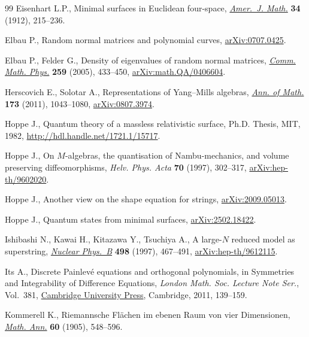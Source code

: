 \begin{thebibliography}{99}
Eisenhart L.P., Minimal surfaces in {E}uclidean four-space,
 \href{https://doi.org/10.2307/2370220}{\textit{Amer.~J. Math.}} \textbf{34}
 (1912), 215--236.

Elbau P., Random normal matrices and polynomial curves,
 \href{http://arxiv.org/abs/0707.0425}{arXiv:0707.0425}.

Elbau P., Felder G., Density of eigenvalues of random normal matrices,
 \href{https://doi.org/10.1007/s00220-005-1372-z}{\textit{Comm. Math. Phys.}}
 \textbf{259} (2005), 433--450,
 \href{http://arxiv.org/abs/math.QA/0406604}{arXiv:math.QA/0406604}.

Herscovich E., Solotar A., Representations of {Y}ang--{M}ills algebras,
 \href{https://doi.org/10.4007/annals.2011.173.2.12}{\textit{Ann. of Math.}}
 \textbf{173} (2011), 1043--1080,
 \href{http://arxiv.org/abs/0807.3974}{arXiv:0807.3974}.
 
Hoppe J., Quantum theory of a massless relativistic surface, Ph.D. Thesis,
 {MIT}, 1982, \url{http://hdl.handle.net/1721.1/15717}.

Hoppe J., On {$M$}-algebras, the quantisation of {N}ambu-mechanics, and volume
 preserving diffeomorphisms, \textit{Helv. Phys. Acta} \textbf{70} (1997),
 302--317, \href{http://arxiv.org/abs/hep-th/9602020}{arXiv:hep-th/9602020}.

Hoppe J., Another view on the shape equation for strings,
 \href{http://arxiv.org/abs/2009.05013}{arXiv:2009.05013}.

Hoppe J., Quantum states from minimal surfaces,
 \href{http://arxiv.org/abs/2502.18422}{arXiv:2502.18422}.

Ishibashi N., Kawai H., Kitazawa Y., Tsuchiya A., A large-{$N$} reduced model
 as superstring,
 \href{https://doi.org/10.1016/S0550-3213(97)00290-3}{\textit{Nuclear
 Phys.~B}} \textbf{498} (1997), 467--491,
 \href{http://arxiv.org/abs/hep-th/9612115}{arXiv:hep-th/9612115}.

Its A., Discrete Painlev\'e equations and orthogonal polynomials, in Symmetries
 and Integrability of Difference Equations, \textit{London Math. Soc. Lecture
 Note Ser.}, Vol.~381,
 \href{https://doi.org/10.1017/CBO9780511997136.007}{Cambridge University
 Press}, Cambridge, 2011, 139--159.

Kommerell K., Riemannsche {F}l\"achen im ebenen {R}aum von vier {D}imensionen,
 \href{https://doi.org/10.1007/BF01561096}{\textit{Math. Ann.}} \textbf{60}
 (1905), 548--596.


\end{thebibliography}
